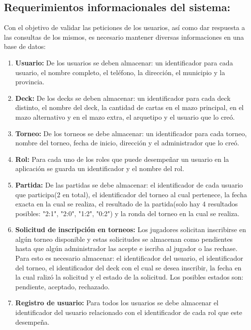 \documentclass[a4paper]{article}
\begin{document}
\subsection{Requerimientos informacionales del sistema:}
Con el objetivo de validar las peticiones de los usuarios, as\'i como dar respuesta a las consultas de los mismos, es necesario mantener diversas informaciones en una base de datos:
\begin{enumerate}
	\item \textbf{Usuario:} De los usuarios se deben almacenar: un identificador para cada usuario, el nombre completo, el tel\'efono, la direcci\'on, el municipio y la provincia.
	\item \textbf{Deck:} De los decks se deben almacenar: un identificador para cada deck distinto, el nombre del deck, la cantidad de cartas en el mazo principal, en el mazo alternativo y en el mazo extra, el arquetipo y el usuario que lo cre\'o.
	\item \textbf{Torneo:} De los torneos se debe almacenar: un identificador para cada torneo, nombre del torneo, fecha de inicio, direcci\'on y el administrador que lo cre\'o.
	\item \textbf{Rol:} Para cada uno de los roles que puede desempe\~nar un usuario en la aplicaci\'on se guarda un identificador y el nombre del rol.
	\item \textbf{Partida:} De las partidas se debe almacenar: el identificador de cada usuario que participa(2 en total), el identificador del torneo al cual pertenece, la fecha exacta en la cual se realiza, el resultado de la partida(solo hay 4 resultados posibles: "2:1", "2:0", "1:2", "0:2") y la ronda del torneo en la cual se realiza.
	\item \textbf{Solicitud de inscripci\'on en torneos:} Los jugadores solicitan inscribirse en alg\'un torneo disponible y estas solicitudes se almacenan como pendientes hasta que alg\'un administrador las acepte e iscriba al jugador o las rechase. Para esto es necesario almacenar: el identificador del usuario, el identificador del torneo, el identificador del deck con el cual se desea inscribir, la fecha en la cual raliz\'o la solicitud y el estado de la solicitud. Los posibles estados son: pendiente, aceptado, rechazado.
	\item \textbf{Registro de usuario:} Para todos los usuarios se debe almacenar el identificador del usuario relacionado con el identificador de cada rol que este desempe\~na.
\end{enumerate} 
\newpage
\end{document}
